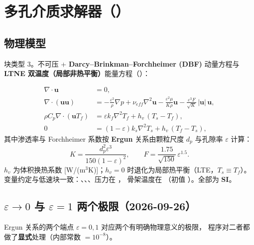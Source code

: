 \section{多孔介质求解器（）}
\label{sec:porous}

\subsection{物理模型}
块类型 3。不可压 + \textbf{Darcy--Brinkman--Forchheimer (DBF)} 动量方程与
\textbf{LTNE 双温度（局部非热平衡）}能量方程（）：

\begin{align}
\nabla\!\cdot\!\mathbf{u} &= 0,\\
\nabla\!\cdot\!(\mathbf{u}\mathbf{u}) &= -\frac{\varepsilon^2}{\rho}\nabla p
  + \nu_{eff}\nabla^2\mathbf{u}
  - \frac{\varepsilon^2\mu}{K\rho}\mathbf{u}
  - \frac{\varepsilon^3 F}{\sqrt{K}}\,\lvert\mathbf{u}\rvert\,\mathbf{u},\\
\rho C_{p}\nabla\!\cdot\!(\mathbf{u}T_f) &= \varepsilon k_f\nabla^2 T_f + h_v\,(T_s-T_f),\\
0 &= (1-\varepsilon)k_s\nabla^2 T_s + h_v\,(T_f-T_s),
\end{align}
其中渗透率与 Forchheimer 系数按 \textbf{Ergun} 关系由颗粒尺度 $d_p$ 与孔隙率 $\varepsilon$ 计算：
\begin{equation}
K=\frac{d_p^{2}\varepsilon^{3}}{150(1-\varepsilon)^{2}},\qquad
F=\frac{1.75}{\sqrt{150}}\,\varepsilon^{1.5}.
\end{equation}
$h_v$ 为体积换热系数 [W/(m$^3$K)]；$h_v=0$ 时退化为局部热平衡（LTE，$T_s\equiv T_f$）。
变量约定与低速块一致：、、、压力在 ，
骨架温度在 （初值 ）。全部为 \textbf{SI}。

\subsection{$\varepsilon\to0$ 与 $\varepsilon=1$ 两个极限（2026-09-26）}
Ergun 关系的两个端点 $\varepsilon=0,1$ 对应两个有明确物理意义的极限，
程序对二者都做了\textbf{显式}处理（内部常数 $=10^{-8}$）。

